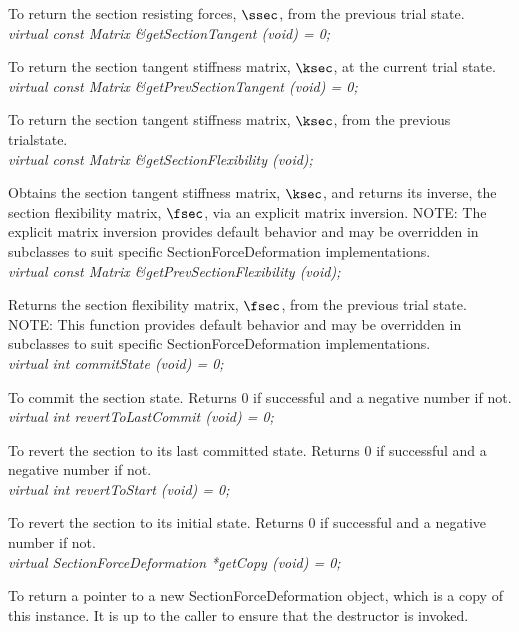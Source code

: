 To return the section resisting forces, $\ssec$, from the previous trial state. \\

{\em virtual const Matrix \&getSectionTangent (void) = 0; } 

To return the section tangent stiffness matrix, $\ksec$, at the current trial state. \\

{\em virtual const Matrix \&getPrevSectionTangent (void) = 0; } 

To return the section tangent stiffness matrix, $\ksec$, from the previous trialstate. \\

{\em virtual const Matrix \&getSectionFlexibility (void); } 

Obtains the section tangent stiffness matrix, $\ksec$, and returns its
inverse, the section flexibility matrix, $\fsec$, via an
explicit matrix inversion.  NOTE: The explicit matrix
inversion provides default behavior and may be overridden in
subclasses to suit specific SectionForceDeformation implementations. \\

{\em virtual const Matrix \&getPrevSectionFlexibility (void); } 

Returns the section flexibility matrix, $\fsec$, from the previous trial
state. NOTE: This function provides default behavior and may be
overridden in subclasses to suit specific SectionForceDeformation
implementations. \\

{\em virtual int commitState (void) = 0; } 

To commit the section state.  Returns $0$ if successful and a negative
number if not. \\

{\em virtual int revertToLastCommit (void) = 0; } 

To revert the section to its last committed state.  Returns $0$ if
successful and a negative number if not. \\

{\em virtual int revertToStart (void) = 0; } 

To revert the section to its initial state. Returns $0$ if successful
and a negative number if not. \\

{\em virtual SectionForceDeformation *getCopy (void) = 0; } 

To return a pointer to a new SectionForceDeformation object, which is a copy 
of this instance. It is up to the caller to ensure that the destructor is invoked. \\

